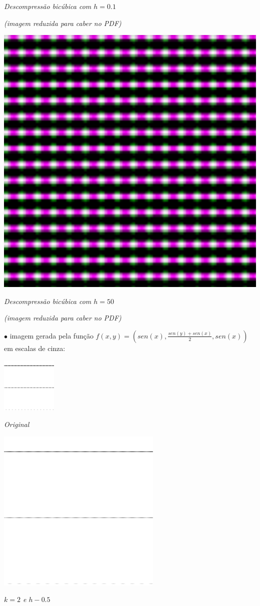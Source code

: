 \documentclass{article}
\begin{document}
\begin{center}
\emph{Descompressão bicúbica com $h = 0.1$}

\emph{(imagem reduzida para caber no PDF)}

\bigskip
\includegraphics[scale=.45]{cubi50.png}

\emph{Descompressão bicúbica com $h = 50$}

\emph{(imagem reduzida para caber no PDF)}

\newpage
\qquad $\bullet$ imagem gerada pela função $f(x, y) = (sen(x), \frac{sen(y) + sen(x)}{2}, sen(x))$ em escalas de cinza:

\begin{center}
\includegraphics{gray.png}

\emph{Original}

\bigskip
\includegraphics{gray2.png}

\emph{$k = 2$ e $h - 0.5$}
\end{center}

\end{center}
\end{document}
